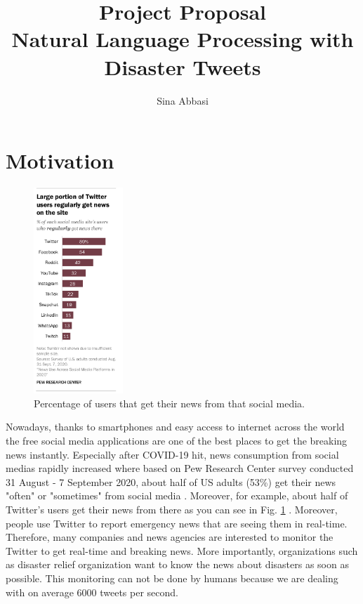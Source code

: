 \documentclass[12pt]{extarticle}
\title{Project Proposal \\
Natural Language Processing with Disaster Tweets
}
\author{Sina Abbasi}
\date{}
\begin{document}
\maketitle


\section*{Motivation}

\begin{figure}
    \begin{center}
    \includegraphics[width=0.3\textwidth,height=0.6\textwidth]{twitterfig1.png}
    \end{center}
    \caption{Percentage of users that get their news from that social media.}
    \label{fig:twitter}
\end{figure}

Nowadays, thanks to smartphones and easy access to internet across the world the free social media applications are one of the best places to get the breaking news instantly. Especially after COVID-19 hit, news consumption from social medias rapidly increased where based on Pew Research Center survey conducted 31 August - 7 September 2020, about half of US adults (53\%) get their news "often" or "sometimes" from social media \cite{shearer2021news}. Moreover, for example, about half of Twitter's users get their news from there as you can see in Fig. \ref{fig:twitter} \cite{shearer2021news}. Moreover, people use Twitter to report emergency news that are seeing them in real-time. Therefore, many companies and news agencies are interested to monitor the Twitter to get real-time and breaking news. More importantly, organizations such as disaster relief organization want to know the news about disasters as soon as possible. This monitoring can not be done by humans because we are dealing with on average 6000 tweets per second.\\
\end{document}
